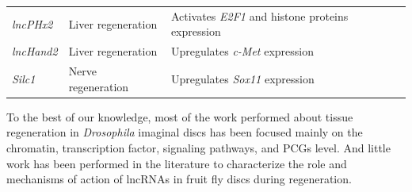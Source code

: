 \begin{table}[!htb]
\begin{scriptsize}
\begin{tabulary}{0.65\linewidth}{lll}
      \textit{lncPHx2}\autocite{sergeeva_2020_liver_regeneration} & Liver regeneration & Activates \textit{E2F1} and histone proteins expression\\
      \textit{lncHand2}\autocite{sergeeva_2020_liver_regeneration} & Liver regeneration & Upregulates \textit{c-Met} expression \\
      \textit{Silc1}\autocite{goldman_2020_tissue_regeneration} & Nerve regeneration & Upregulates \textit{Sox11} expression\\
    \end{tabulary}
  \end{scriptsize}
  \label{tab:lncRNA-example.reg}
\end{table}

To the best of our knowledge, most of the work performed about tissue regeneration in \textit{Drosophila} imaginal discs has been focused mainly on the chromatin, transcription factor, signaling pathways, and PCGs level.\autocite{vizcaya_2018,vizcaya_2020_chromatin,santabarbara_2015,blanco_2010} And little work has been performed in the literature to characterize the role and mechanisms of action of lncRNAs in fruit fly discs during regeneration. 

\clearpage


